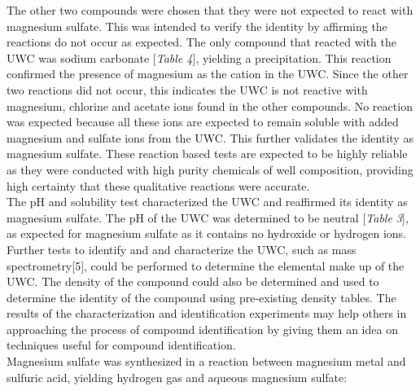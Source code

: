 \documentclass[12pt]{article}
\begin{document}
\begin{center}
\end{center}
The other two compounds were chosen that they were not expected to react with magnesium sulfate. This was intended to verify the identity by affirming the reactions do not occur as expected. The only compound that reacted with the UWC was sodium carbonate [\textit{Table 4}], yielding a precipitation. This reaction confirmed the presence of magnesium as the cation in the UWC. Since the other two reactions did not occur, this indicates the UWC is not reactive with magnesium, chlorine and acetate ions found in the other compounds. No reaction was expected because all these ions are expected to remain soluble with added magnesium and sulfate ions from the UWC. This further validates the identity as magnesium sulfate. These reaction based tests are expected to be highly reliable as they were conducted with high purity chemicals of well composition, providing high certainty that these qualitative reactions were accurate.
\vspace{6pt}\\The pH and solubility test characterized the UWC and reaffirmed its identity as magnesium sulfate. The pH of the UWC was determined to be neutral [\textit{Table 3}], as expected for magnesium sulfate as it contains no hydroxide or hydrogen ions.
\vspace{6pt}\\Further tests to identify and and characterize the UWC, such as mass spectrometry[5], could be performed to determine the elemental make up of the UWC. The density of the compound could also be determined and used to determine the identity of the compound using pre-existing density tables. The results of the characterization and identification experiments may help others in approaching the process of compound identification by giving them an idea on techniques useful for compound identification. 
\vspace{6pt}\\Magnesium sulfate was synthesized in a reaction between magnesium metal and sulfuric acid, yielding hydrogen gas and aqueous magnesium sulfate:
\begin{center}
\end{center}
\end{document}
